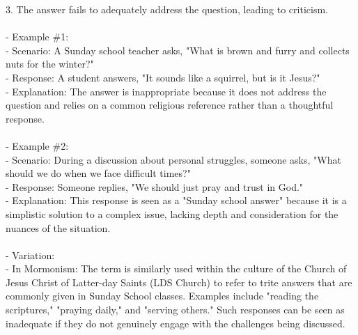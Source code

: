 \documentclass[a4paper,12pt,single,pdftex]{scrartcl}
\begin{document}
    
        3. The answer fails to adequately address the question, leading to criticism.
    \\

    
      
    \\

    
      - Example \#1:
    \\

    
        - Scenario: A Sunday school teacher asks, "What is brown and furry and collects nuts for the winter?"
    \\

    
        - Response: A student answers, "It sounds like a squirrel, but is it Jesus?"
    \\

    
        - Explanation: The answer is inappropriate because it does not address the question and relies on a common religious reference rather than a thoughtful response.
    \\

    
      
    \\

    
      - Example \#2:
    \\

    
        - Scenario: During a discussion about personal struggles, someone asks, "What should we do when we face difficult times?"
    \\

    
        - Response: Someone replies, "We should just pray and trust in God."
    \\

    
        - Explanation: This response is seen as a "Sunday school answer" because it is a simplistic solution to a complex issue, lacking depth and consideration for the nuances of the situation.
    \\

    
      
    \\

    
      - Variation:
    \\

    
        - In Mormonism: The term is similarly used within the culture of the Church of Jesus Christ of Latter-day Saints (LDS Church) to refer to trite answers that are commonly given in Sunday School classes. Examples include "reading the scriptures," "praying daily," and "serving others." Such responses can be seen as inadequate if they do not genuinely engage with the challenges being discussed.
    \\
\end{document}
